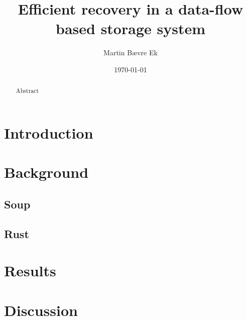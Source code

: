 \documentclass[a4paper,twoside]{article}
\begin{document}
\title{Efficient recovery in a data-flow based storage system}
\author{Martin Bævre Ek}
\date{\today}
\maketitle



\begin{abstract}
  Abstract
\end{abstract}

\section{Introduction}

\tableofcontents

\section{Background}
\subsection{Soup}
\subsection{Rust}

\section{Results}
\section{Discussion}



\end{document}
